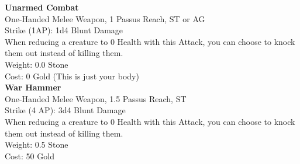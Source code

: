\textbf{Unarmed Combat}\\
One-Handed Melee Weapon, 1 Passus Reach, ST or AG\\
Strike (1AP): 1d4 Blunt Damage\\
When reducing a creature to 0 Health with this Attack, you can choose to knock them out instead of killing them.\\
Weight: 0.0 Stone\\
Cost: 0 Gold (This is just your body)\\


\textbf{War Hammer}\\
One-Handed Melee Weapon, 1.5 Passus Reach, ST\\
Strike (4 AP): 3d4 Blunt Damage\\
When reducing a creature to 0 Health with this Attack, you can choose to knock them out instead of killing them.\\
Weight: 0.5 Stone\\
Cost: 50 Gold\\